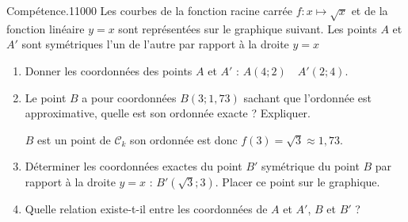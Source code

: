 \begin{pageParcourst}

\begin{ExoCtN}{Compétence.}{1}{1}{0}{0}{0}
Les courbes de la fonction racine carrée $f:x\mapsto \sqrt{x}$ et de la fonction linéaire $y=x$ sont représentées sur le graphique suivant. Les points $A$ et $A'$ sont symétriques l'un de l'autre par rapport à la droite $y=x$

%
%
%
%
%

\begin{enumerate}
\item Donner les coordonnées des points $A$ et $A'$ : $A(4;2)\quad A'(2;4)$.
\item Le point $B$ a pour coordonnées $B(3;1,73)$ sachant que l'ordonnée est approximative, quelle est son ordonnée exacte ? Expliquer.

$B$ est un point de $\mathcal{C}_k$ son ordonnée est donc $f(3)=\sqrt{3}\approx1,73$. 
\item Déterminer les coordonnées exactes du point $B'$ symétrique du point $B$ par rapport à la droite $y=x$ : $B'(\sqrt{3};3)$. Placer ce point sur le graphique.
\item Quelle relation existe-t-il entre les coordonnées de $A$ et $A'$, $B$ et $B'$ ?


\end{enumerate}
\end{ExoCtN}
\end{pageParcourst}
